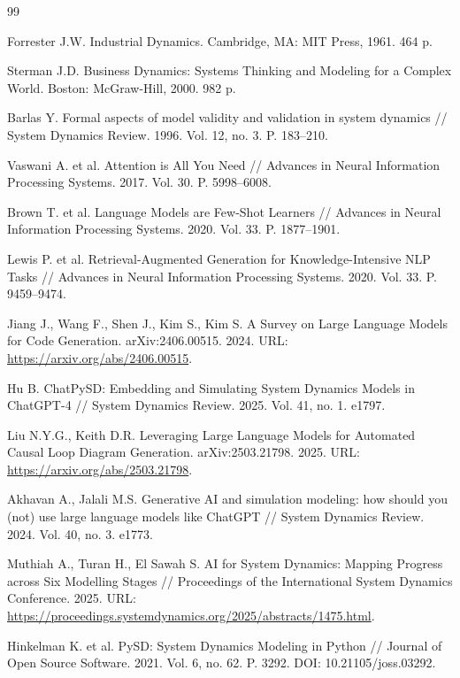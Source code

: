 \begin{thebibliography}{99}

Forrester J.W. Industrial Dynamics. Cambridge, MA: MIT Press, 1961. 464 p.

Sterman J.D. Business Dynamics: Systems Thinking and Modeling for a Complex World. Boston: McGraw-Hill, 2000. 982 p.

Barlas Y. Formal aspects of model validity and validation in system dynamics // System Dynamics Review. 1996. Vol. 12, no. 3. P. 183--210.

Vaswani A. et al. Attention is All You Need // Advances in Neural Information Processing Systems. 2017. Vol. 30. P. 5998--6008.

Brown T. et al. Language Models are Few-Shot Learners // Advances in Neural Information Processing Systems. 2020. Vol. 33. P. 1877--1901.

Lewis P. et al. Retrieval-Augmented Generation for Knowledge-Intensive NLP Tasks // Advances in Neural Information Processing Systems. 2020. Vol. 33. P. 9459--9474.

Jiang J., Wang F., Shen J., Kim S., Kim S. A Survey on Large Language Models for Code Generation. arXiv:2406.00515. 2024. URL: \url{https://arxiv.org/abs/2406.00515}.

Hu B. ChatPySD: Embedding and Simulating System Dynamics Models in ChatGPT-4 // System Dynamics Review. 2025. Vol. 41, no. 1. e1797.

Liu N.Y.G., Keith D.R. Leveraging Large Language Models for Automated Causal Loop Diagram Generation. arXiv:2503.21798. 2025. URL: \url{https://arxiv.org/abs/2503.21798}.

Akhavan A., Jalali M.S. Generative AI and simulation modeling: how should you (not) use large language models like ChatGPT // System Dynamics Review. 2024. Vol. 40, no. 3. e1773.

Muthiah A., Turan H., El Sawah S. AI for System Dynamics: Mapping Progress across Six Modelling Stages // Proceedings of the International System Dynamics Conference. 2025. URL: \url{https://proceedings.systemdynamics.org/2025/abstracts/1475.html}.

Hinkelman K. et al. PySD: System Dynamics Modeling in Python // Journal of Open Source Software. 2021. Vol. 6, no. 62. P. 3292. DOI: 10.21105/joss.03292.


\end{thebibliography}
